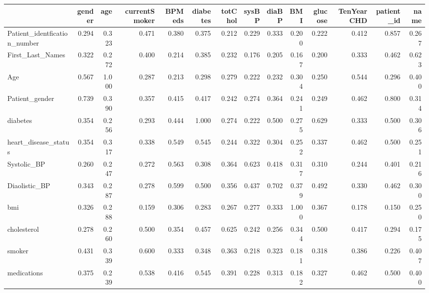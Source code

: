 \begin{tabular}{lrrrrrrrrrrrrr}
\toprule
 & gender & age & currentSmoker & BPMeds & diabetes & totChol & sysBP & diaBP & BMI & glucose & TenYearCHD & patient_id & name \\
\midrule
Patient_identfication_number & 0.294 & 0.323 & 0.471 & 0.380 & 0.375 & 0.212 & 0.229 & 0.333 & 0.200 & 0.222 & 0.412 & 0.857 & 0.267 \\
First_Last_Names & 0.322 & 0.272 & 0.400 & 0.214 & 0.385 & 0.232 & 0.176 & 0.205 & 0.167 & 0.200 & 0.333 & 0.462 & 0.623 \\
Age & 0.567 & 1.000 & 0.287 & 0.213 & 0.298 & 0.279 & 0.222 & 0.232 & 0.304 & 0.250 & 0.544 & 0.296 & 0.400 \\
Patient_gender & 0.739 & 0.390 & 0.357 & 0.415 & 0.417 & 0.242 & 0.274 & 0.364 & 0.241 & 0.249 & 0.462 & 0.800 & 0.314 \\
diabetes & 0.354 & 0.256 & 0.293 & 0.444 & 1.000 & 0.274 & 0.222 & 0.500 & 0.275 & 0.629 & 0.333 & 0.500 & 0.306 \\
heart_disease_status & 0.354 & 0.317 & 0.338 & 0.549 & 0.545 & 0.244 & 0.322 & 0.304 & 0.252 & 0.337 & 0.462 & 0.500 & 0.251 \\
Systolic_BP & 0.260 & 0.247 & 0.272 & 0.563 & 0.308 & 0.364 & 0.623 & 0.418 & 0.317 & 0.310 & 0.244 & 0.401 & 0.216 \\
Diaolistic_BP & 0.343 & 0.287 & 0.278 & 0.599 & 0.500 & 0.356 & 0.437 & 0.702 & 0.379 & 0.492 & 0.330 & 0.462 & 0.300 \\
bmi & 0.326 & 0.288 & 0.159 & 0.306 & 0.283 & 0.267 & 0.277 & 0.333 & 1.000 & 0.367 & 0.178 & 0.150 & 0.250 \\
cholesterol & 0.278 & 0.260 & 0.500 & 0.354 & 0.457 & 0.625 & 0.242 & 0.256 & 0.344 & 0.500 & 0.417 & 0.294 & 0.175 \\
smoker & 0.431 & 0.339 & 0.600 & 0.333 & 0.348 & 0.363 & 0.218 & 0.323 & 0.181 & 0.318 & 0.386 & 0.226 & 0.407 \\
medications & 0.375 & 0.239 & 0.538 & 0.416 & 0.545 & 0.391 & 0.228 & 0.313 & 0.182 & 0.327 & 0.462 & 0.500 & 0.400 \\
\bottomrule
\end{tabular}
